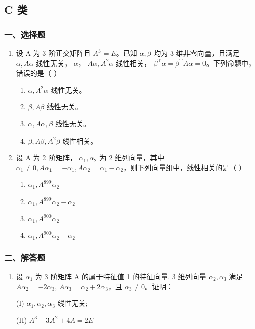 \documentclass[12pt, a4paper]{ctexart}
\begin{document}
\subsection{C 类}

\subsubsection*{一、选择题}

\begin{enumerate}
    \item 设 A 为 3 阶正交矩阵且 $ A^3 = E $。已知 $ \alpha, \beta $ 均为 3 维非零向量，且满足 $ \alpha, A\alpha $ 线性无关， $ \alpha $， $ A\alpha, A^2\alpha $ 线性相关， $ \beta^\mathrm{T}\alpha = \beta^\mathrm{T}A\alpha = 0 $。下列命题中，错误的是（ \underline{\hspace{1cm}} ）
    \begin{enumerate}[label=(\Alph*)]
        \item $ \alpha, A^2\alpha $ 线性无关。
        \item $ \beta, A\beta $ 线性无关。
        \item $ \alpha, A\alpha, \beta $ 线性无关。
        \item $ \beta, A\beta, A^2\beta $ 线性相关。
    \end{enumerate}

    \item 设 A 为 2 阶矩阵， $ \alpha_{1}, \alpha_{2} $ 为 2 维列向量，其中 $ \alpha_{1} \neq 0, A\alpha_{1} = -\alpha_{1}, A\alpha_{2} = \alpha_{1} - \alpha_{2} $，则下列向量组中，线性相关的是（ \underline{\hspace{1cm}} ）
    \begin{enumerate}[label=(\Alph*)]
        \item $ \alpha_{1}, A^{899} \alpha_{2} $
        \item $ \alpha_{1}, A^{899} \alpha_{2} - \alpha_{2} $
        \item $ \alpha_{1}, A^{900} \alpha_{2} $
        \item $ \alpha_{1}, A^{900} \alpha_{2} - \alpha_{2} $
    \end{enumerate}
\end{enumerate}

\subsubsection*{二、解答题}

\begin{enumerate}[start=3]
    \item 设 $ \alpha_{1} $ 为 3 阶矩阵 A 的属于特征值 1 的特征向量. 3 维列向量 $ \alpha_{2}, \alpha_{3} $ 满足 $ A\alpha_{2} = -2\alpha_{3} $, $ A\alpha_{3}=\alpha_{2}+2\alpha_{3} $，且 $ \alpha_{3}\neq0 $。证明：
    
    (I) $ \alpha_{1},\alpha_{2},\alpha_{3} $ 线性无关;
    
    (II) $ A^{3}-3A^{2}+4A=2E $
\end{enumerate}
\end{document}
